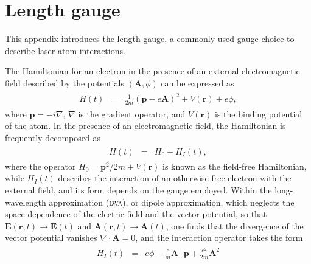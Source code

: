 \chapter{Length gauge}
\label{app:L_gauge}

This appendix introduces the length gauge, a commonly used gauge
choice to describe laser-atom interactions. %

The Hamiltonian for an electron in the presence of an external
electromagnetic field described by the potentials $(\mathbf{A},\phi)$
can be expressed as
%
\begin{eqnarray}
  \label{eq:H_lgauge}
  \begin{split}
    H(t) & = & \frac{1}{2m}(\mathbf{p} - e\mathbf{A})^{2}
    + V(\mathbf{r}) + e\phi,
  \end{split}
\end{eqnarray}
%
where $\mathbf{p} = -i\nabla$, $\nabla$ is the gradient operator, and
$V(\mathbf{r})$ is the binding potential of the atom. In the presence
of an electromagnetic field, the Hamiltonian is frequently decomposed
as
%
\begin{eqnarray}
  \label{eq:H_decomposed}
  \begin{split}
    H(t) & = & H_{0} + H_{I}(t),
  \end{split}
\end{eqnarray}
%
where the operator $H_{0} = \mathbf{p}^{2}/2m + V(\mathbf{r})$ is
known as the field-free Hamiltonian, while $H_{I}(t)$ describes the
interaction of an otherwise free electron with the external field, and
its form depends on the gauge employed. Within the long-wavelength
approximation (\textsc{lwa}), or dipole approximation, which neglects
the space dependence of the electric field and the vector potential,
so that $\mathbf{E}(\mathbf{r}, t) \to \mathbf{E}(t)$ and
$\mathbf{A}(\mathbf{r}, t) \to \mathbf{A}(t)$, one finds that the
divergence of the vector potential vanishes $\nabla\cdot\mathbf{A} =
0$, and the interaction operator takes the form
%
\begin{eqnarray}
  \label{eq:H_dipole}
  \begin{split}
    H_{I}(t) & = & e\phi -
    \frac{e}{m}\mathbf{A}\cdot\mathbf{p} + \frac{e^{2}}{2m}\mathbf{A}^{2}
  \end{split}
\end{eqnarray}
%

